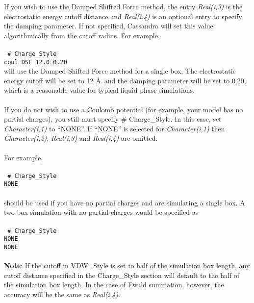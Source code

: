 If you wish to use the Damped Shifted Force method, the entry {\it Real(i,3)}
is the electrostatic energy cutoff distance and {\it Real(i,4)} is an optional
entry to specify the damping parameter. If not specified, Cassandra will
set this value algorithmically from the cutoff radius. For example, 
\\ \\
\texttt{
\# Charge\_Style \\
coul DSF 12.0 0.20}\\ 

will use the Damped Shifted Force method for a single box. The electrostatic
energy cutoff will be set to 12 \AA\ and the damping parameter will be set
to 0.20, which is a reasonable value for
typical liquid phase simulations. \\  \\
%
If you do not wish to use a Coulomb potential (for example, your model
has no partial charges), you still must specify \# Charge\_Style. In
this case, set {\it Character(i,1)} to ``NONE''. If ``NONE'' is
selected for {\it Character(i,1)} then {\it Character(i,2)}, 
{\it  Real(i,3)} and {\it Real(i,4)} are omitted.  
\\ \\
For example, \\ \\
\texttt{
\# Charge\_Style \\
NONE} 
\\ \\
should be used if you have no partial charges and are simulating a
single box. A two box simulation with no partial charges would be
specified as \\ \\
\texttt{
\# Charge\_Style \\
NONE \\
NONE}
\\ \\
%
{\bf{Note}}: If the cutoff in VDW\_Style is set to half of the
simulation box length, any cutoff distance specified in the
Charge\_Style section will default to the half of the simulation box
length. In the case of Ewald summation, however, the accuracy will be
the same as {\it Real(i,4)}. 
%
%
